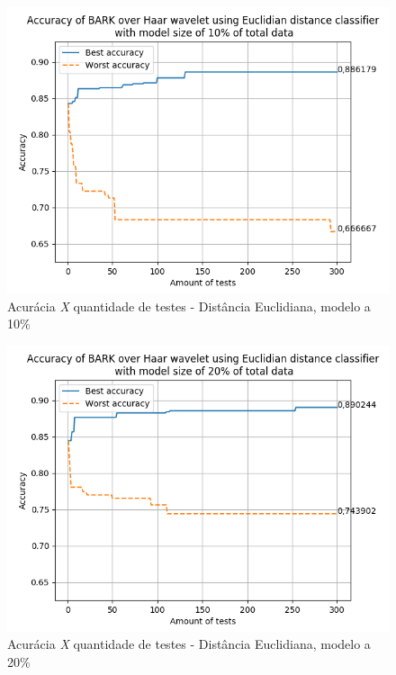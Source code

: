 \begin{myenv}{1.5}
		\begin{figure}[h]
			\centering
			\includegraphics{images/results/confusionMatrices/classifier_Euclidian_10}
			\caption{Acurácia \textit{X} quantidade de testes - Distância Euclidiana, modelo a 10\%}
			\label{fig:classifiereuclidian10}
		\end{figure}
		
		
		\newpage
		\begin{figure}[h]
			\centering
			\includegraphics{images/results/confusionMatrices/classifier_Euclidian_20}
			\caption{Acurácia \textit{X} quantidade de testes - Distância Euclidiana, modelo a 20\%}
			\label{fig:classifiereuclidian20}
		\end{figure}
		


\end{myenv}
